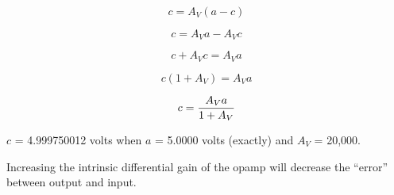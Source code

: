 





$$c = A_V (a - c)$$

$$c = A_V a - A_V c$$

$$c + A_V c = A_V a$$

$$c (1 + A_V) = A_V a$$

$$c = {A_V a \over {1 + A_V}}$$

$c$ = 4.999750012 volts when $a$ = 5.0000 volts (exactly) and $A_V$ = 20,000.  

\vskip 10pt

Increasing the intrinsic differential gain of the opamp will decrease the ``error'' between output and input.













